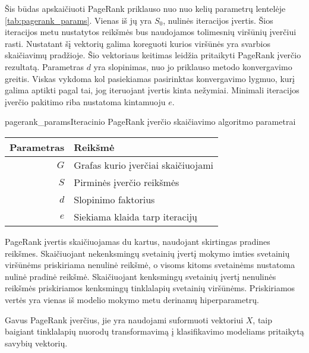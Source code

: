 Šis būdas apskaičiuoti PageRank priklauso nuo nuo kelių parametrų lentelėje \vref{tab:pagerank_params}. Vienas iš jų yra $S_0$, nulinės iteracijos įvertis. Šios iteracijos metu nustatytos reikšmės bus naudojamos tolimesnių viršūnių įverčiui rasti. Nustatant šį vektorių galima koreguoti kurios viršūnės yra svarbios skaičiavimų pradžioje. Šio vektoriaus keitimas leidžia pritaikyti PageRank įverčio rezultatą. Parametras $d$ yra slopinimas, nuo jo priklauso metodo konvergavimo greitis. Viskas vykdoma kol pasiekiamas pasirinktas konvergavimo lygmuo, kurį galima aptikti pagal tai, jog iteruojant įvertis kinta nežymiai. Minimali iteracijos įverčio pakitimo riba nustatoma kintamuoju $e$.

\begin{ktutable}{pagerank_params}{Iteracinio PageRank įverčio skaičiavimo algoritmo parametrai}
    \begin{tabular}{ | r | l | }
        \hline
        Parametras & Reikšmė \\ \hline
        $G$ & Grafas kurio įverčiai skaičiuojami \\ \hline
        $S$ & Pirminės įverčio reikšmės \\ \hline
        $d$ & Slopinimo faktorius \\ \hline
        $e$ & Siekiama klaida tarp iteracijų \\ \hline
    \end{tabular}
\end{ktutable}

PageRank įvertis skaičiuojamas du kartus, naudojant skirtingas pradines reikšmes. Skaičiuojant nekenksmingų svetainių įvertį mokymo imties svetainių viršūnėms priskiriama nenulinė reikšmė, o visoms kitoms svetainėms nustatoma nulinė pradinė reikšmė. Skaičiuojant kenksmingų svetainių įvertį nenulinės reikšmės priskiriamos kenksmingų tinklalapių svetainių viršūnėms. Priskiriamos vertės yra vienas iš modelio mokymo metu derinamų hiperparametrų.

Gavus PageRank įverčius, jie yra naudojami suformuoti vektoriui $X$, taip baigiant tinklalapių nuorodų transformavimą į klasifikavimo modeliams pritaikytą savybių vektorių.
